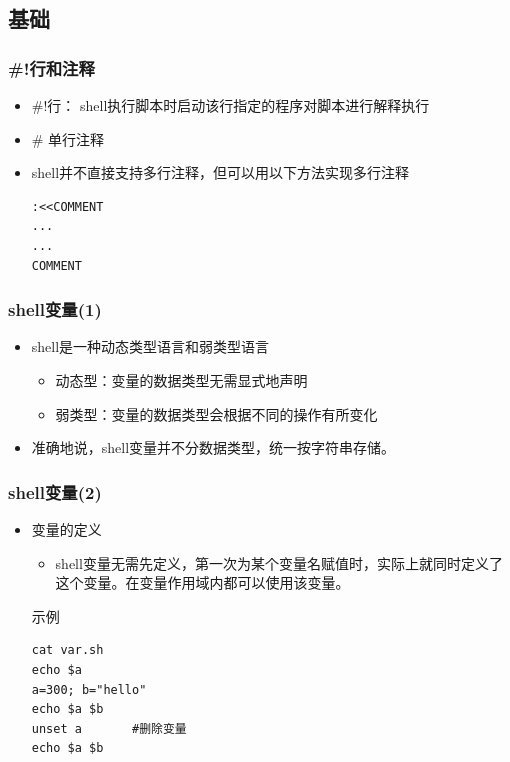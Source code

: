 \documentclass[xcolor=svgnames,presentation]{beamer}
\begin{document}
\subsection{基础}
\label{sec-1-2}
\begin{frame}[fragile]
\frametitle{\#!行和注释}
\label{sec-1-2-1}
\begin{itemize}

\item \#!行： shell执行脚本时启动该行指定的程序对脚本进行解释执行
\label{sec-1-2-1-1}%

\item \# 单行注释
\label{sec-1-2-1-2}%

\item shell并不直接支持多行注释，但可以用以下方法实现多行注释\\
\label{sec-1-2-1-3}%
\begin{verbatim}
:<<COMMENT
...
...
COMMENT
\end{verbatim}
\end{itemize} %
\end{frame}
\begin{frame}
\frametitle{shell变量(1)}
\label{sec-1-2-2}
\begin{itemize}

\item shell是一种动态类型语言和弱类型语言
\label{sec-1-2-2-1}%
\begin{itemize}

\item 动态型：变量的数据类型无需显式地声明
\label{sec-1-2-2-1-1}%

\item 弱类型：变量的数据类型会根据不同的操作有所变化
\label{sec-1-2-2-1-2}%
\end{itemize} %

\item 准确地说，shell变量并不分数据类型，统一按字符串存储。
\label{sec-1-2-2-2}%
\end{itemize} %
\end{frame}
\begin{frame}[fragile]
\frametitle{shell变量(2)}
\label{sec-1-2-3}
\begin{itemize}

\item 变量的定义
\label{sec-1-2-3-1}%
\begin{itemize}

\item shell变量无需先定义，第一次为某个变量名赋值时，实际上就同时定义了这个变量。在变量作用域内都可以使用该变量。
\label{sec-1-2-3-1-1}%
\end{itemize} %
\begin{exampleblock}{示例}
\label{sec-1-2-3-1-2}


\begin{verbatim}
cat var.sh
echo $a
a=300; b="hello"
echo $a $b
unset a       #删除变量
echo $a $b
\end{verbatim}
\end{exampleblock}
\end{itemize} %
\end{frame}
\end{document}
